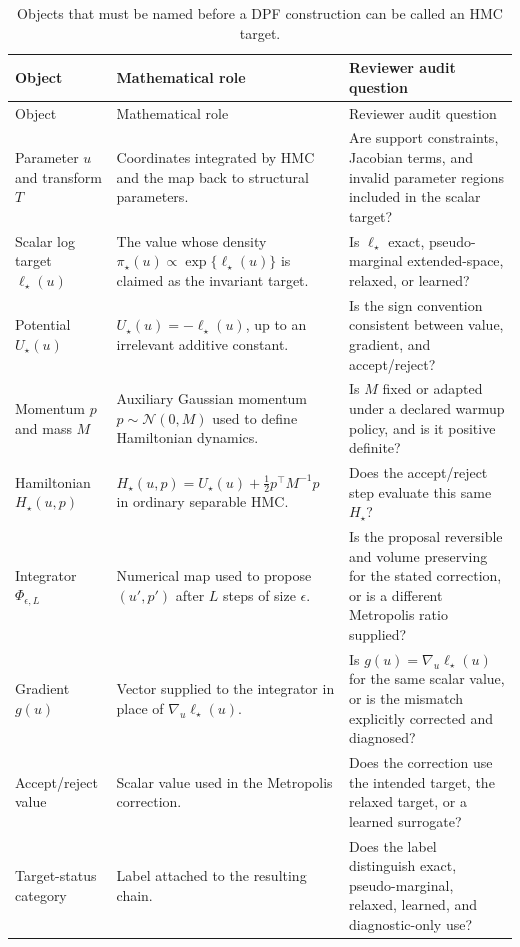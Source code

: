 \begin{longtable}{@{}p{} p{} p{}@{}}
\caption{Objects that must be named before a DPF construction can be called an
HMC target.}
\label{tab:bf-dpf-hmc-object-inventory}\\
\toprule
Object & Mathematical role & Reviewer audit question \\
\midrule
\endfirsthead
\toprule
Object & Mathematical role & Reviewer audit question \\
\midrule
\endhead
Parameter $u$ and transform $T$ &
Coordinates integrated by HMC and the map back to structural parameters. &
Are support constraints, Jacobian terms, and invalid parameter regions included
in the scalar target? \\
Scalar log target $\ell_\star(u)$ &
The value whose density $\pi_\star(u)\propto\exp\{\ell_\star(u)\}$ is claimed
as the invariant target. &
Is $\ell_\star$ exact, pseudo-marginal extended-space, relaxed, or learned? \\
Potential $U_\star(u)$ &
$U_\star(u)=-\ell_\star(u)$, up to an irrelevant additive constant. &
Is the sign convention consistent between value, gradient, and accept/reject? \\
Momentum $p$ and mass $M$ &
Auxiliary Gaussian momentum $p\sim\mathcal{N}(0,M)$ used to define Hamiltonian
dynamics. &
Is $M$ fixed or adapted under a declared warmup policy, and is it positive
definite? \\
Hamiltonian $H_\star(u,p)$ &
$H_\star(u,p)=U_\star(u)+\frac{1}{2}p^\top M^{-1}p$ in ordinary separable HMC. &
Does the accept/reject step evaluate this same $H_\star$? \\
Integrator $\Phi_{\epsilon,L}$ &
Numerical map used to propose $(u',p')$ after $L$ steps of size $\epsilon$. &
Is the proposal reversible and volume preserving for the stated correction, or
is a different Metropolis ratio supplied? \\
Gradient $g(u)$ &
Vector supplied to the integrator in place of $\nabla_u\ell_\star(u)$. &
Is $g(u)=\nabla_u\ell_\star(u)$ for the same scalar value, or is the mismatch
explicitly corrected and diagnosed? \\
Accept/reject value &
Scalar value used in the Metropolis correction. &
Does the correction use the intended target, the relaxed target, or a learned
surrogate? \\
Target-status category &
Label attached to the resulting chain. &
Does the label distinguish exact, pseudo-marginal, relaxed, learned, and
diagnostic-only use? \\
\bottomrule
\end{longtable}

